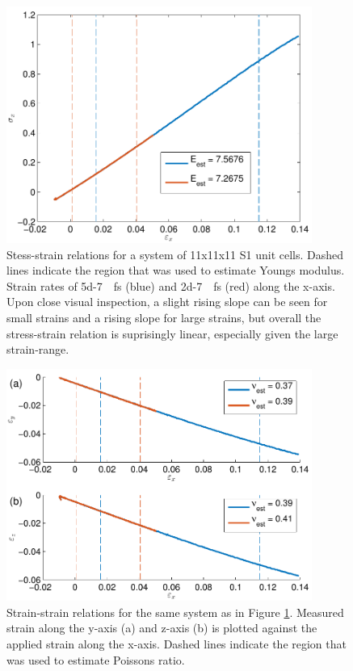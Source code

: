 \begin{figure}
\centering
\includegraphics[width=10cm]{../figures/thesis/stress_strain_11_11_11_tip4p_ice_uam.pdf}
\caption{Stess-strain relations for a system of 11x11x11 S1 unit cells. Dashed lines indicate the region that was used to estimate Youngs modulus. Strain rates of \SI{5d-7}{\per\femto\second} (blue) and \SI{2d-7}{\per\femto\second} (red) along the x-axis. Upon close visual inspection, a slight rising slope can be seen for small strains and a rising slope for large strains, but overall the stress-strain relation is suprisingly linear, especially given the large strain-range.}
\label{fig:stress_strain_11_11_11_tip4p_ice_uam}

\end{figure}

\begin{figure}
\centering
\includegraphics[width=10cm]{../figures/thesis/strain_strain_11_11_11_y_z_poisson_tip4p_ice_uam.pdf}
\caption{Strain-strain relations for the same system as in Figure \ref{fig:stress_strain_11_11_11_tip4p_ice_uam}. Measured strain along the y-axis (a) and z-axis (b) is plotted against the applied strain along the x-axis. Dashed lines indicate the region that was used to estimate Poissons ratio.}
\label{fig:strain_strain_11_11_11_y_z_poisson_tip4p_ice_uam}

\end{figure}

